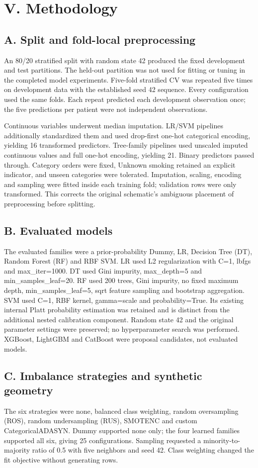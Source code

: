 \documentclass[10pt,twocolumn,letterpaper]{article}
\begin{document}
\section*{V. Methodology}
\subsection*{A. Split and fold-local preprocessing}
An 80/20 stratified split with random state 42 produced the fixed development and test partitions. The held-out partition was not used for fitting or tuning in the completed model experiments. Five-fold stratified CV was repeated five times on development data with the established seed 42 sequence. Every configuration used the same folds. Each repeat predicted each development observation once; the five predictions per patient were not independent observations.


Continuous variables underwent median imputation. LR/SVM pipelines additionally standardized them and used drop-first one-hot categorical encoding, yielding 16 transformed predictors. Tree-family pipelines used unscaled imputed continuous values and full one-hot encoding, yielding 21. Binary predictors passed through. Category orders were fixed, Unknown smoking retained an explicit indicator, and unseen categories were tolerated. Imputation, scaling, encoding and sampling were fitted inside each training fold; validation rows were only transformed. This corrects the original schematic's ambiguous placement of preprocessing before splitting.


\subsection*{B. Evaluated models}
The evaluated families were a prior-probability Dummy, LR, Decision Tree (DT), Random Forest (RF) and RBF SVM. LR used L2 regularization with C=1, lbfgs and max\_iter=1000. DT used Gini impurity, max\_depth=5 and min\_samples\_leaf=20. RF used 200 trees, Gini impurity, no fixed maximum depth, min\_samples\_leaf=5, sqrt feature sampling and bootstrap aggregation. SVM used C=1, RBF kernel, gamma=scale and probability=True. Its existing internal Platt probability estimation was retained and is distinct from the additional nested calibration component. Random state 42 and the original parameter settings were preserved; no hyperparameter search was performed. XGBoost, LightGBM and CatBoost were proposal candidates, not evaluated models.


\subsection*{C. Imbalance strategies and synthetic geometry}
The six strategies were none, balanced class weighting, random oversampling (ROS), random undersampling (RUS), SMOTENC and custom CategoricalADASYN. Dummy supported none only; the four learned families supported all six, giving 25 configurations. Sampling requested a minority-to-majority ratio of 0.5 with five neighbors and seed 42. Class weighting changed the fit objective without generating rows.
\end{document}
